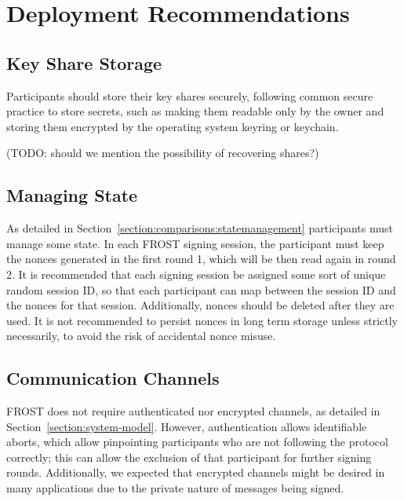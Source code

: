 \section{Deployment Recommendations}\label{section:deployment-recommendations}


\subsection{Key Share Storage}

Participants should store their key shares securely, following common secure
practice to store secrets, such as making them readable only by the owner and
storing them encrypted by the operating system keyring or keychain.

(TODO: should we mention the possibility of recovering shares?)


\subsection{Managing State}

As detailed in Section~\ref{section:comparisons:statemanagement} participants must
manage some state. In each FROST signing session, the participant must keep the
nonces generated in the first round 1, which will be then read again in round 2.
It is recommended that each signing session be assigned some sort of unique
random session ID, so that each participant can map between the session ID and
the nonces for that session. Additionally, nonces should be deleted after they
are used. It is not recommended to persist nonces in long term storage unless
strictly necessarily, to avoid the risk of accidental nonce misuse.

\subsection{Communication Channels}

FROST does not require authenticated nor encrypted channels, as detailed
in Section~\ref{section:system-model}. However, authentication allows identifiable
aborts, which allow pinpointing participants who are not following the protocol
correctly; this can allow the exclusion of that participant for further signing
rounds. Additionally, we expected that encrypted channels might be desired in
many applications due to the private nature of messages being signed.


